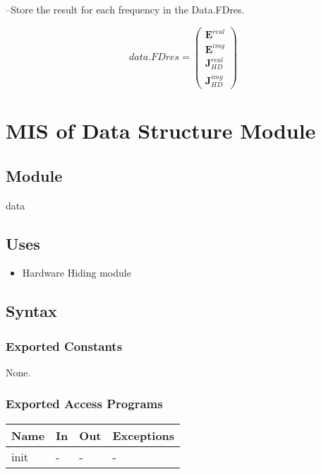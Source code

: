 \documentclass[12pt, titlepage]{article}
\begin{document}
\begin{itemize}
 
\subitem --Store the result for each frequency in the Data.FDres. 
 
 \begin{equation*}
 	data.FDres = \begin{pmatrix}
 		\textbf{E}^{real}\\ \textbf{E}^{img}\\ \textbf{J}^{real}_{HD}\\ \textbf{J}^{img}_{HD}
 	\end{pmatrix}
 \end{equation*}
 
\end{itemize}

\newpage
%
%
%
%
\section{MIS of Data Structure Module} \label{DSM} 

\subsection{Module}
data

\subsection{Uses}
\begin{itemize}
\item Hardware Hiding module
\end{itemize}

\subsection{Syntax}

\subsubsection{Exported Constants}
None.
\subsubsection{Exported Access Programs}

\begin{center}
\begin{tabular}{p{2cm} p{4cm} p{4cm} p{2cm}}
	\hline
	\textbf{Name} & \textbf{In} & \textbf{Out} & \textbf{Exceptions} \\
	\hline
	init & - & - & - \\
	\hline
\end{tabular}
\end{center}
\end{document}
